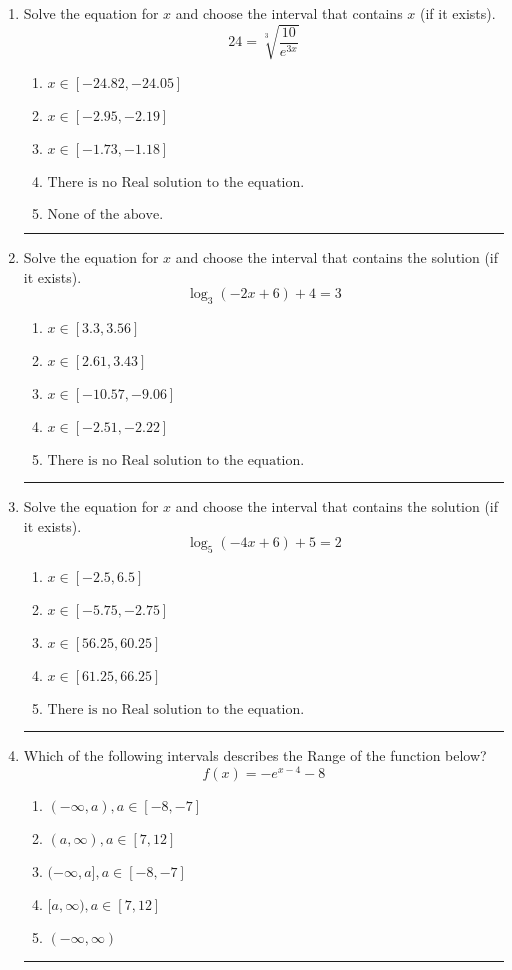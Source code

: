\documentclass[14pt]{extbook}
\newcommand{\litem}[1]{\item#1\hspace*{-1cm}\rule{\textwidth}{0.4pt}}
\begin{document}
\begin{enumerate}
{\begin{enumerate}[label=\Alph*.]
\end{enumerate} }
\litem{
 Solve the equation for $x$ and choose the interval that contains $x$ (if it exists).\[  24 = \sqrt[3]{\frac{10}{e^{3x}}} \]\begin{enumerate}[label=\Alph*.]
\item \( x \in [-24.82, -24.05] \)
\item \( x \in [-2.95, -2.19] \)
\item \( x \in [-1.73, -1.18] \)
\item \( \text{There is no Real solution to the equation.} \)
\item \( \text{None of the above.} \)

\end{enumerate} }
\litem{
Solve the equation for $x$ and choose the interval that contains the solution (if it exists).\[ \log_{3}{(-2x+6)}+4 = 3 \]\begin{enumerate}[label=\Alph*.]
\item \( x \in [3.3, 3.56] \)
\item \( x \in [2.61, 3.43] \)
\item \( x \in [-10.57, -9.06] \)
\item \( x \in [-2.51, -2.22] \)
\item \( \text{There is no Real solution to the equation.} \)

\end{enumerate} }
\litem{
Solve the equation for $x$ and choose the interval that contains the solution (if it exists).\[ \log_{5}{(-4x+6)}+5 = 2 \]\begin{enumerate}[label=\Alph*.]
\item \( x \in [-2.5, 6.5] \)
\item \( x \in [-5.75, -2.75] \)
\item \( x \in [56.25, 60.25] \)
\item \( x \in [61.25, 66.25] \)
\item \( \text{There is no Real solution to the equation.} \)

\end{enumerate} }
\litem{
Which of the following intervals describes the Range of the function below?\[ f(x) = -e^{x-4}-8 \]\begin{enumerate}[label=\Alph*.]
\item \( (-\infty, a), a \in [-8, -7] \)
\item \( (a, \infty), a \in [7, 12] \)
\item \( (-\infty, a], a \in [-8, -7] \)
\item \( [a, \infty), a \in [7, 12] \)
\item \( (-\infty, \infty) \)


\end{enumerate}}
\end{enumerate}
\end{document}
